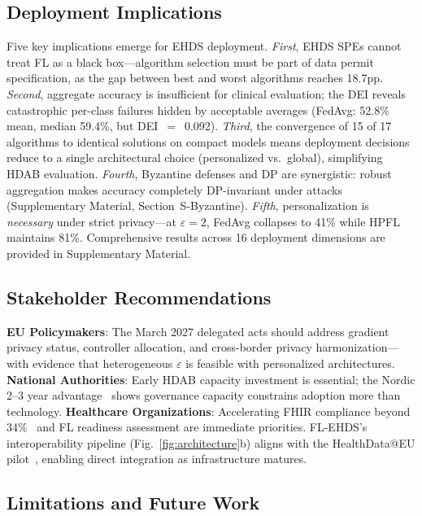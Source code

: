 \documentclass[conference]{IEEEtran}
\begin{document}
\subsection{Deployment Implications}

Five key implications emerge for EHDS deployment. \textit{First}, EHDS SPEs cannot treat FL as a black box---algorithm selection must be part of data permit specification, as the gap between best and worst algorithms reaches 18.7pp. \textit{Second}, aggregate accuracy is insufficient for clinical evaluation; the DEI reveals catastrophic per-class failures hidden by acceptable averages (FedAvg: 52.8\% mean, median 59.4\%, but DEI~$=$~0.092). \textit{Third}, the convergence of 15 of 17 algorithms to identical solutions on compact models means deployment decisions reduce to a single architectural choice (personalized vs.\ global), simplifying HDAB evaluation. \textit{Fourth}, Byzantine defenses and DP are synergistic: robust aggregation makes accuracy completely DP-invariant under attacks (Supplementary Material, Section~S-Byzantine). \textit{Fifth}, personalization is \textit{necessary} under strict privacy---at $\varepsilon{=}2$, FedAvg collapses to 41\% while HPFL maintains 81\%. Comprehensive results across 16 deployment dimensions are provided in Supplementary Material.

\subsection{Stakeholder Recommendations}

\textbf{EU Policymakers}: The March 2027 delegated acts should address gradient privacy status, controller allocation, and cross-border privacy harmonization---with evidence that heterogeneous $\varepsilon$ is feasible with personalized architectures. \textbf{National Authorities}: Early HDAB capacity investment is essential; the Nordic 2--3 year advantage~\cite{tehdas2024ready} shows governance capacity constrains adoption more than technology. \textbf{Healthcare Organizations}: Accelerating FHIR compliance beyond 34\%~\cite{hussein2025interop} and FL readiness assessment are immediate priorities. FL-EHDS's interoperability pipeline (Fig.~\ref{fig:architecture}b) aligns with the HealthData@EU pilot~\cite{christiansen2025pilot}, enabling direct integration as infrastructure matures.

\subsection{Limitations and Future Work}
\end{document}
